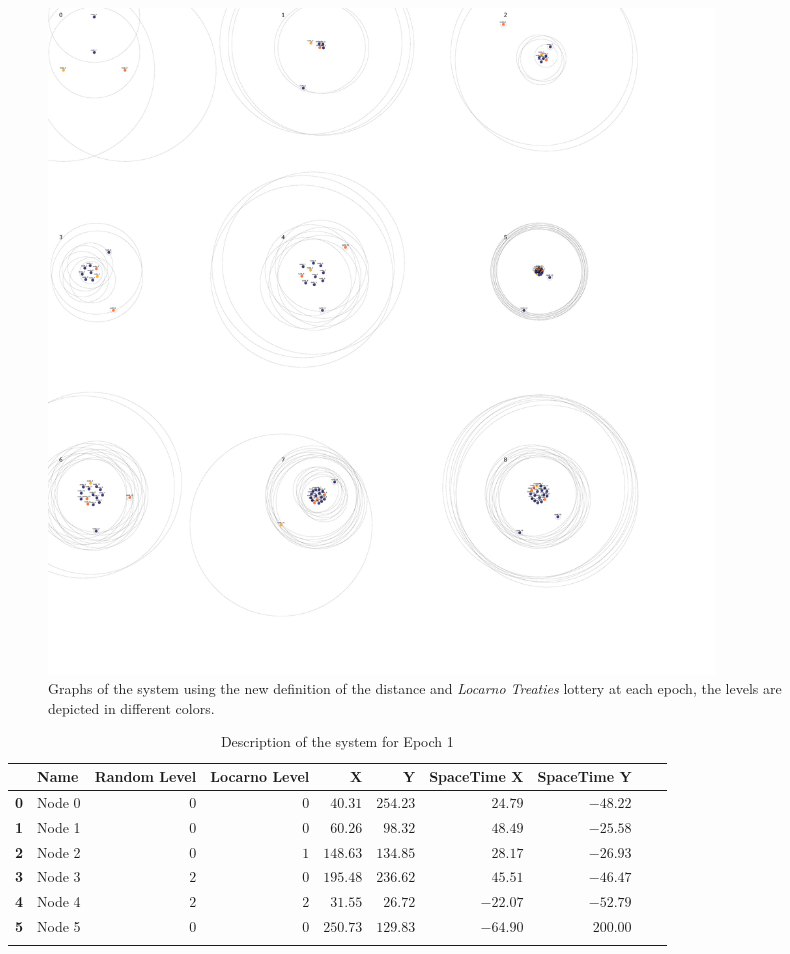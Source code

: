\documentclass[a4paper,11pt,twoside=semi,openright]{report}
\begin{document}
\begin{figure}[!h] 
\centering
\includegraphics[width=500pt]{figures/SpaceTime-Locarno}
\caption{Graphs of the system using the new definition of the distance and
    \textit{Locarno Treaties} lottery at each epoch, the levels are depicted in
    different colors.} \label{fig:SpaceTime-Locarno}
\end{figure}

\begin{table}[h]
\centering
\tiny
\begin{tabular}{@{}llrrrrrrll@{}}
\toprule
& \textbf{Name}   &\textbf{Random Level} &\textbf{Locarno Level} & \textbf{X} & \textbf{Y} & \textbf{SpaceTime X} & \textbf{SpaceTime Y}  \\ \midrule
\textbf{0} & Node 0&$0$&$0$&$40.31$&$254.23$&$24.79$&$-48.22$&\\ \hdashline
\textbf{1} & Node 1&$0$&$0$&$60.26$&$98.32$&$48.49$&$-25.58$&\\ \hdashline
\textbf{2} & Node 2&$0$&$1$&$148.63$&$134.85$&$28.17$&$-26.93$&\\ \hdashline
\textbf{3} & Node 3&$2$&$0$&$195.48$&$236.62$&$45.51$&$-46.47$&\\ \hdashline
\textbf{4} & Node 4&$2$&$2$&$31.55$&$26.72$&$-22.07$&$-52.79$&\\ \hdashline
\textbf{5} & Node 5&$0$&$0$&$250.73$&$129.83$&$-64.90$&$200.00$&\\ \hdashline\midrule
\bottomrule
\end{tabular}
\caption{Description of the system for Epoch 1}
\end{table}
\end{document}
